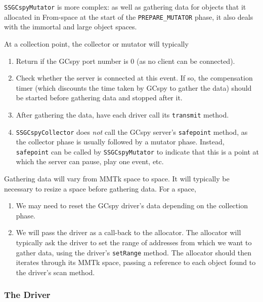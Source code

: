 \texttt{SSGCspyMutator} is more complex: as well as gathering data
for objects that it allocated in From-space at the start of
the \texttt{PREPARE\_MUTATOR} phase, it also deals with the 
immortal and large object spaces.

At a collection point, the collector or mutator will typically
\begin{enumerate}
\item Return if the GCspy port number is 0 (as no client can be connected).

\item Check whether the server is connected at this event. If so, the 
   compensation timer (which discounts the time taken by GCspy to
   gather the data) should be started before gathering data and
   stopped after it.

\item After gathering the data, have each driver  call its
   \texttt{transmit} method.

\item \texttt{SSGCspyCollector} does \emph{not} call the GCspy
   server's \texttt{safepoint} method, 
   as the collector phase is usually followed by a mutator
   phase.
   Instead, \texttt{safepoint} can be called by 
   \texttt{SSGCspyMutator} to indicate that this
   is a point at which the server can pause, play one
   event, etc. 
\end{enumerate}

Gathering data will vary from MMTk space to space. It will typically be
necessary to resize a space before gathering data.
For a space, 

\begin{enumerate}
\item We may need to reset the GCspy driver's data 
   depending on the collection phase.

\item We will pass the driver as a call-back to the allocator.
The allocator will typically ask the driver to set the range of addresses
from which we want to gather data, using the driver's \texttt{setRange} method.
The allocator should then iterates through its MMTk space, passing a reference to each object
found to the driver's scan method.
\end{enumerate}


\subsubsection{The Driver}

